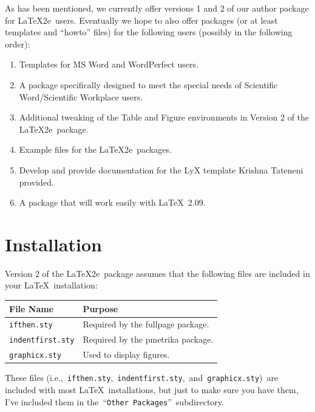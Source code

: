 \documentclass[titlepage,12pt]{article}
\begin{document}
As has been mentioned, we currently offer versions 1 and 2 of our
author package for \LaTeX2e\ users. Eventually we hope to also
offer packages (or at least templates and ``howto'' files) for the
following users (possibly in the following order):

\begin{enumerate}
\item Templates for MS Word and WordPerfect users.
\item A package specifically designed to meet the special needs of Scientific Word/Scientific Workplace users.
\item Additional tweaking of the Table and Figure environments in Version 2 of the \LaTeX2e\ package.
\item Example files for the \LaTeX2e\ packages.
\item Develop and provide documentation for the LyX template Krishna
Tateneni provided.
\item A package that will work easily with \LaTeX\ 2.09.
\end{enumerate}

\section{Installation}\label{install}

Version 2 of the \LaTeX2e\ package assumes that the
following files are included in your \LaTeX\ installation:

{}
\begin{center}
\begin{tabular}{|l|l|}\hline
  \textbf{File Name} &   \textbf{Purpose} \\ \hline\hline
  \texttt{ifthen.sty} & Required by the fullpage package. \\
  \texttt{indentfirst.sty} & Required by the pmetrika package. \\
  \texttt{graphicx.sty} & Used to display figures. \\ \hline
\end{tabular}
\end{center}\vspace{0.5\baselineskip}
{}

These files
(i.e.,~\texttt{ifthen.sty},~\texttt{indentfirst.sty},~and~\texttt{graphicx.sty})~are
included with most \LaTeX\ installations, but just to make sure
you have them, I've included them in the~``\texttt{Other
Packages}''~subdirectory.
\end{document}
